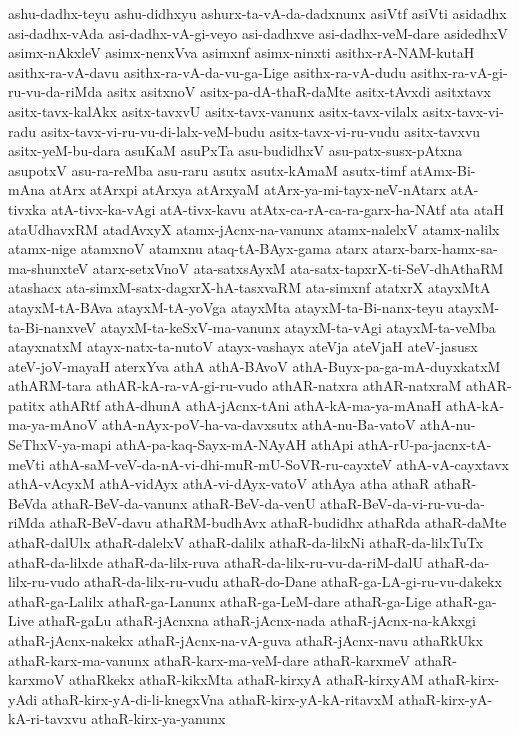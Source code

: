 {ashu-dadhx-teyu
ashu-didhxyu
ashurx-ta-vA-da-dadxnunx
asiVtf
asiVti
asidadhx
asi-dadhx-vAda
asi-dadhx-vA-gi-veyo
asi-dadhxve
asi-dadhx-veM-dare
asidedhxV
asimx-nAkxleV
asimx-nenxVva
asimxnf
asimx-ninxti
asithx-rA-NAM-kutaH
asithx-ra-vA-davu
asithx-ra-vA-da-vu-ga-Lige
asithx-ra-vA-dudu
asithx-ra-vA-gi-ru-vu-da-riMda
asitx
asitxnoV
asitx-pa-dA-thaR-daMte
asitx-tAvxdi
asitxtavx
asitx-tavx-kalAkx
asitx-tavxvU
asitx-tavx-vanunx
asitx-tavx-vilalx
asitx-tavx-vi-radu
asitx-tavx-vi-ru-vu-di-lalx-veM-budu
asitx-tavx-vi-ru-vudu
asitx-tavxvu
asitx-yeM-bu-dara
asuKaM
asuPxTa
asu-budidhxV
asu-patx-susx-pAtxna
asupotxV
asu-ra-reMba
asu-raru
asutx
asutx-kAmaM
asutx-timf
atAmx-Bi-mAna
atArx
atArxpi
atArxya
atArxyaM
atArx-ya-mi-tayx-neV-nAtarx
atA-tivxka
atA-tivx-ka-vAgi
atA-tivx-kavu
atAtx-ca-rA-ca-ra-garx-ha-NAtf
ata
ataH
ataUdhavxRM
atadAvxyX
atamx-jAcnx-na-vanunx
atamx-nalelxV
atamx-nalilx
atamx-nige
atamxnoV
atamxnu
ataq-tA-BAyx-gama
atarx
atarx-barx-hamx-sa-ma-shunxteV
atarx-setxVnoV
ata-satxsAyxM
ata-satx-tapxrX-ti-SeV-dhAthaRM
atashacx
ata-simxM-satx-dagxrX-hA-tasxvaRM
ata-simxnf
atatxrX
atayxMtA
atayxM-tA-BAva
atayxM-tA-yoVga
atayxMta
atayxM-ta-Bi-nanx-teyu
atayxM-ta-Bi-nanxveV
atayxM-ta-keSxV-ma-vanunx
atayxM-ta-vAgi
atayxM-ta-veMba
atayxnatxM
atayx-natx-ta-nutoV
atayx-vashayx
ateVja
ateVjaH
ateV-jasusx
ateV-joV-mayaH
aterxYva
athA
athA-BAvoV
athA-Buyx-pa-ga-mA-duyxkatxM
athARM-tara
athAR-kA-ra-vA-gi-ru-vudo
athAR-natxra
athAR-natxraM
athAR-patitx
athARtf
athA-dhunA
athA-jAcnx-tAni
athA-kA-ma-ya-mAnaH
athA-kA-ma-ya-mAnoV
athA-nAyx-poV-ha-va-davxsutx
athA-nu-Ba-vatoV
athA-nu-SeThxV-ya-mapi
athA-pa-kaq-Sayx-mA-NAyAH
athApi
athA-rU-pa-jacnx-tA-meVti
athA-saM-veV-da-nA-vi-dhi-muR-mU-SoVR-ru-cayxteV
athA-vA-cayxtavx
athA-vAcyxM
athA-vidAyx
athA-vi-dAyx-vatoV
athAya
atha
athaR
athaR-BeVda
athaR-BeV-da-vanunx
athaR-BeV-da-venU
athaR-BeV-da-vi-ru-vu-da-riMda
athaR-BeV-davu
athaRM-budhAvx
athaR-budidhx
athaRda
athaR-daMte
athaR-dalUlx
athaR-dalelxV
athaR-dalilx
athaR-da-lilxNi
athaR-da-lilxTuTx
athaR-da-lilxde
athaR-da-lilx-ruva
athaR-da-lilx-ru-vu-da-riM-dalU
athaR-da-lilx-ru-vudo
athaR-da-lilx-ru-vudu
athaR-do-Dane
athaR-ga-LA-gi-ru-vu-dakekx
athaR-ga-Lalilx
athaR-ga-Lanunx
athaR-ga-LeM-dare
athaR-ga-Lige
athaR-ga-Live
athaR-gaLu
athaR-jAcnxna
athaR-jAcnx-nada
athaR-jAcnx-na-kAkxgi
athaR-jAcnx-nakekx
athaR-jAcnx-na-vA-guva
athaR-jAcnx-navu
athaRkUkx
athaR-karx-ma-vanunx
athaR-karx-ma-veM-dare
athaR-karxmeV
athaR-karxmoV
athaRkekx
athaR-kikxMta
athaR-kirxyA
athaR-kirxyAM
athaR-kirx-yAdi
athaR-kirx-yA-di-li-knegxVna
athaR-kirx-yA-kA-ritavxM
athaR-kirx-yA-kA-ri-tavxvu
athaR-kirx-ya-yanunx
}
